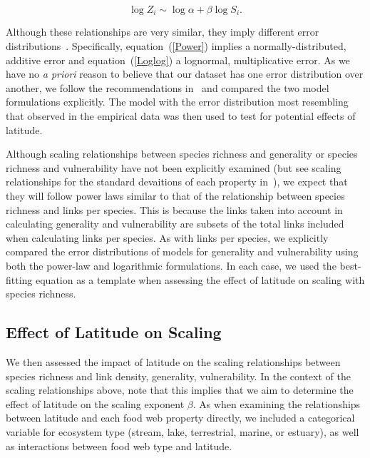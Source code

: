\documentclass[12pt]{article}
\begin{document}
\begin{spacing}{1.0}
    \begin{equation}
    \label{Loglog}
    \log{Z_{i}} \sim \log{\alpha} + \beta\log{S_{i}}  .
    \end{equation}


    \noindent Although these relationships are very similar, they imply different error distributions~\citep{Xiao2011}.
    Specifically, equation~(\ref{Power}) implies a normally-distributed, additive error and equation~(\ref{Loglog}) a lognormal,
    multiplicative error. As we have no \emph{a priori} reason to believe that our dataset has one error distribution
    over another, we follow the recommendations in~\citet{Xiao2011} and compared the two
    model formulations explicitly. The model with the error distribution most resembling that observed in the empirical
    data was then used to test for potential effects of latitude.


    Although scaling relationships between species richness and generality or
    species richness and vulnerability have not been explicitly examined (but see scaling 
    relationships for the standard devaitions of each property in~\citet{Riede2010}), we expect that they will follow
    power laws similar to that of the relationship between species richness and links per species.
    This is because the links taken into account in calculating generality and vulnerability are subsets 
    of the total links included when calculating links per species. As with links per species, we explicitly 
    compared the error distributions of models for generality and vulnerability using
    both the power-law and logarithmic formulations. 
    In each case, we used the best-fitting equation as a template when assessing the effect of latitude on scaling with
    species richness.


  \subsection*{Effect of Latitude on Scaling}



    We then assessed the impact of latitude on the scaling relationships between species richness and 
    link density, generality, vulnerability. In the context of the scaling relationships above, note 
    that this implies that we aim to determine the effect of latitude on
    the scaling exponent $\beta$. As when examining the relationships between latitude and each food 
    web property directly, we included a categorical variable for ecosystem type (stream, lake, 
    terrestrial, marine, or estuary), as well as interactions between food web type and latitude.



\end{spacing}
\end{document}
